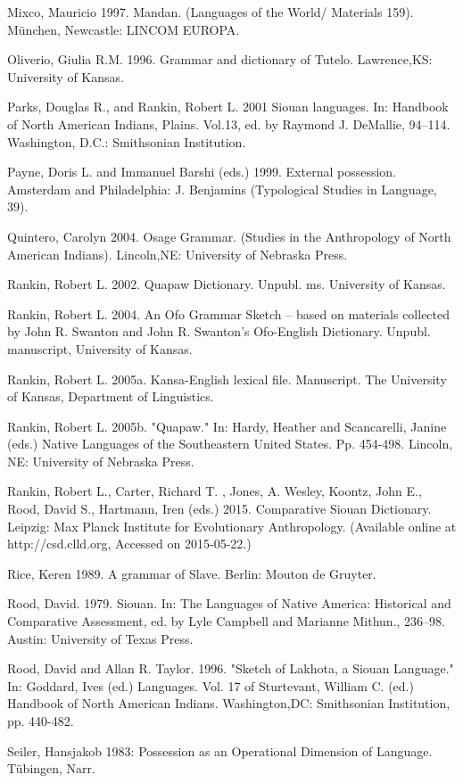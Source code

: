 \documentclass[output=paper]{LSP/langsci}
\begin{document}
\begin{reflist}
Mixco, Mauricio 1997. Mandan. (Languages of the World/ Materials 159). München, Newcastle: LINCOM EUROPA.

Oliverio, Giulia R.M. 1996. Grammar and dictionary of Tutelo. Lawrence,KS: University of Kansas.

Parks, Douglas R., and Rankin, Robert L. 2001 Siouan languages. In: Handbook of North American Indians, Plains. Vol.13, ed. by Raymond J. DeMallie, 94–114. Washington, D.C.: Smithsonian Institution.

Payne, Doris L. and Immanuel Barshi (eds.) 1999. External possession. Amsterdam and Philadelphia: J. Benjamins (Typological Studies in Language, 39).

Quintero, Carolyn 2004. Osage Grammar. (Studies in the Anthropology of North American Indians). Lincoln,NE: University of Nebraska Press.

Rankin, Robert L. 2002. Quapaw Dictionary. Unpubl. ms. University of Kansas.

Rankin, Robert L. 2004. An Ofo Grammar Sketch – based on materials collected by John R. Swanton and John R. Swanton's Ofo-English Dictionary. Unpubl. manuscript, University of Kansas. 

Rankin, Robert L. 2005a. Kansa-English lexical file. Manuscript. The University of Kansas, Department of Linguistics.

Rankin, Robert L. 2005b. "Quapaw." In: Hardy, Heather and Scancarelli, Janine (eds.) Native Languages of the Southeastern United States. Pp. 454-498. Lincoln, NE: University of Nebraska Press.

Rankin, Robert L., Carter, Richard T. , Jones, A. Wesley, Koontz, John E., Rood, David S., Hartmann, Iren (eds.) 2015. Comparative Siouan Dictionary. Leipzig: Max Planck Institute for Evolutionary Anthropology. (Available online at http://csd.clld.org, Accessed on 2015-05-22.)

Rice, Keren 1989. A grammar of Slave. Berlin: Mouton de Gruyter.

Rood, David. 1979. Siouan. In: The Languages of Native America: Historical and Comparative Assessment, ed. by Lyle Campbell and Marianne Mithun., 236–98. Austin: University of Texas Press.

Rood, David and Allan R. Taylor. 1996. "Sketch of Lakhota, a Siouan Language." In: Goddard, Ives (ed.) Languages. Vol. 17 of Sturtevant, William C. (ed.) Handbook of North American Indians. Washington,DC: Smithsonian Institution, pp. 440-482.

Seiler, Hansjakob 1983: Possession as an Operational Dimension of Language. Tübingen, Narr.


\end{reflist}
\end{document}
